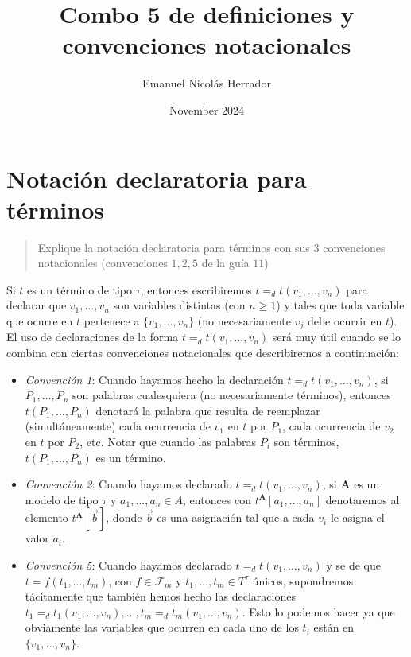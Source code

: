 \documentclass{article}
\title{Combo 5 de definiciones y convenciones notacionales}
\author{Emanuel Nicolás Herrador}
\date{November 2024}
\begin{document}
\maketitle

\section{Notación declaratoria para términos}
\begin{quote}
  Explique la notación declaratoria para términos con sus $3$ convenciones notacionales (convenciones $1,2,5$ de la guía $11$)
\end{quote}
Si $t$ es un término de tipo $\tau$, entonces escribiremos $t=_d t(v_1,\dots,v_n)$ para declarar que $v_1,\dots,v_n$ son variables distintas (con $n\geq 1$) y tales que toda variable que ocurre en $t$ pertenece a $\{v_1,\dots,v_n\}$ (no necesariamente $v_j$ debe ocurrir en $t$).
\newline
El uso de declaraciones de la forma $t=_d t(v_1,\dots,v_n)$ será muy útil cuando se lo combina con ciertas convenciones notacionales que describiremos a continuación:
\begin{itemize}
  \item \textit{Convención 1}: Cuando hayamos hecho la declaración $t=_d t(v_1,\dots,v_n)$, si $P_1,\dots,P_n$ son palabras cualesquiera (no necesariamente términos), entonces $t(P_1,\dots,P_n)$ denotará la palabra que resulta de reemplazar (simultáneamente) cada ocurrencia de $v_1$ en $t$ por $P_1$, cada ocurrencia de $v_2$ en $t$ por $P_2$, etc.
        \newline
        Notar que cuando las palabras $P_i$ son términos, $t(P_1,\dots,P_n)$ es un término.
  \item \textit{Convención 2}: Cuando hayamos declarado $t=_d t(v_1,\dots,v_n)$, si $\mathbf{A}$ es un modelo de tipo $\tau$ y $a_1,\dots,a_n\in A$, entonces con $t^\mathbf{A}[a_1,\dots,a_n]$ denotaremos al elemento $t^\mathbf{A}[\vec{b}]$, donde $\vec{b}$ es una asignación tal que a cada $v_i$ le asigna el valor $a_i$.
  \item \textit{Convención 5}: Cuando hayamos declarado $t=_d t(v_1,\dots,v_n)$ y se de que $t=f(t_1,\dots,t_m)$, con $f\in\mathcal{F}_m$ y $t_1,\dots,t_m\in T^\tau$ únicos, supondremos tácitamente que también hemos hecho las declaraciones $t_1=_d t_1(v_1,\dots,v_n),\dots,t_m=_d t_m(v_1,\dots,v_n)$.
        \newline
        Esto lo podemos hacer ya que obviamente las variables que ocurren en cada uno de los $t_i$ están en $\{v_1,\dots,v_n\}$.
\end{itemize}
\end{document}

